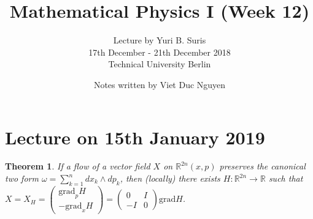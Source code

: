 \documentclass[a4paper, 11pt]{article}
\newtheorem{theorem}{Theorem}
\begin{document}
\title{Mathematical Physics I (Week 12) }
\author{ Lecture by Yuri B. Suris \\ 17th December - 21th December 2018 \\ Technical University Berlin}
\date{ Notes written by Viet Duc Nguyen}
\maketitle



\section*{Lecture on 15th January 2019}
\begin{theorem}
	If a flow of a vector field $X$ on $\mathbb R^{2n}(x,p)$ preserves the canonical two form $\omega = \sum^n_{k=1} dx_k \land dp_k$, then (locally) there exists $H: \mathbb R^{2n} \to \mathbb R$ such that $X = X_H = \begin{pmatrix}
		\mathrm{grad}_pH \\ \mathrm{-grad}_xH
	\end{pmatrix} = \begin{pmatrix}
		0 & I \\ -I & 0
	\end{pmatrix} \mathrm{grad} H$.
\end{theorem}
\end{document}
